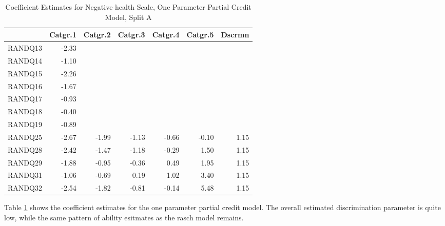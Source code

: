 \documentclass{article}
\begin{document}
\begin{table}[ht]
\centering
\begin{tabular}{rrrrrrr}
  \hline
 & Catgr.1 & Catgr.2 & Catgr.3 & Catgr.4 & Catgr.5 & Dscrmn \\ 
  \hline
RANDQ13 & -2.33 &  &  &  &  &  \\ 
  RANDQ14 & -1.10 &  &  &  &  &  \\ 
  RANDQ15 & -2.26 &  &  &  &  &  \\ 
  RANDQ16 & -1.67 &  &  &  &  &  \\ 
  RANDQ17 & -0.93 &  &  &  &  &  \\ 
  RANDQ18 & -0.40 &  &  &  &  &  \\ 
  RANDQ19 & -0.89 &  &  &  &  &  \\ 
  RANDQ25 & -2.67 & -1.99 & -1.13 & -0.66 & -0.10 & 1.15 \\ 
  RANDQ28 & -2.42 & -1.47 & -1.18 & -0.29 & 1.50 & 1.15 \\ 
  RANDQ29 & -1.88 & -0.95 & -0.36 & 0.49 & 1.95 & 1.15 \\ 
  RANDQ31 & -1.06 & -0.69 & 0.19 & 1.02 & 3.40 & 1.15 \\ 
  RANDQ32 & -2.54 & -1.82 & -0.81 & -0.14 & 5.48 & 1.15 \\ 
   \hline
\end{tabular}
\caption{Coefficient Estimates for Negative health Scale, One Parameter Partial Credit Model, Split A} 
\label{tab:neghealth2apcm1pl}
\end{table}
Table \ref{tab:neghealth2apcm1pl} shows the coefficient estimates for the one parameter partial credit model. The overall estimated discrimination parameter is quite low, while the same pattern of ability esitmates as the rasch model remains. 
\end{document}
